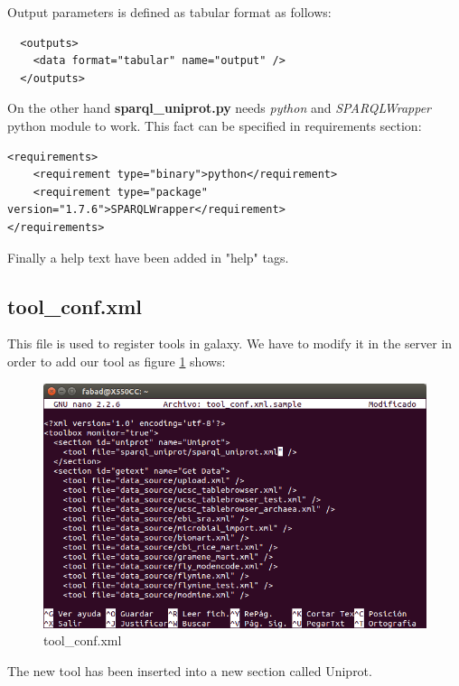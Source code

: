 \documentclass[12pt]{article}
\begin{document}
Output parameters is defined as tabular format as follows:
\begin{verbatim}
  <outputs>
    <data format="tabular" name="output" />
  </outputs>
\end{verbatim}

On the other hand \textbf{sparql\_uniprot.py} needs \textit{python} and \textit{SPARQLWrapper} python module to work. This fact can be specified in requirements section:
\begin{verbatim}
<requirements>
	<requirement type="binary">python</requirement>
	<requirement type="package" version="1.7.6">SPARQLWrapper</requirement>
</requirements>
\end{verbatim}

Finally a help text have been added in "help" tags.

\subsection{tool\_conf.xml}
This file is used to register tools in galaxy. We have to modify it in the server in order to add our tool as figure \ref{fig:register} shows:

\begin{figure}[h]
	\caption{tool\_conf.xml}
	\label{fig:register}
	\includegraphics[width=1\textwidth]{figures/register}
\end{figure}

The new tool has been inserted into a new section called Uniprot.

\clearpage
\end{document}
